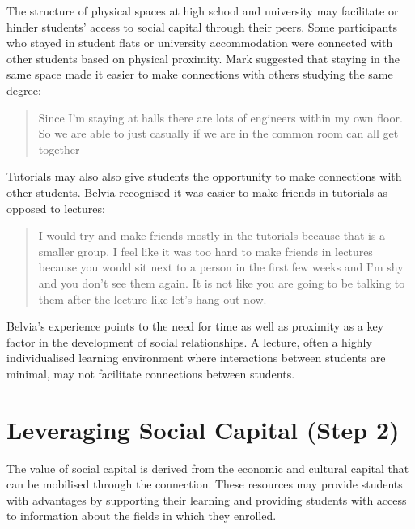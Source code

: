 The structure of physical spaces at high school and university may facilitate or hinder students' access to social capital through their peers. Some participants who stayed in student flats or university accommodation were connected with other students based on physical proximity. Mark suggested that staying in the same space made it easier to make connections with others studying the same degree: \blockquote{Since I’m staying at halls there are lots of engineers within my own floor. So we are able to just casually if we are in the common room can all get together}. Tutorials may also also give students the opportunity to make connections with other students. Belvia recognised it was easier to make friends in tutorials as opposed to lectures: \blockquote{I would try and make friends mostly in the tutorials because that is a smaller group. I feel like it was too hard to make friends in lectures because you would sit next to a person in the first few weeks and I’m shy and you don’t see them again. It is not like you are going to be talking to them after the lecture like let’s hang out now.} Belvia's experience points to the need for time as well as proximity as a key factor in the development of social relationships. A lecture, often a highly individualised learning environment where interactions between students are minimal, may not facilitate connections between students.


\section{Leveraging Social Capital (Step 2)}
The value of social capital is derived from the economic and cultural capital that can be mobilised through the connection. These resources may provide students with advantages by supporting their learning and providing students with access to information about the fields in which they enrolled.  

